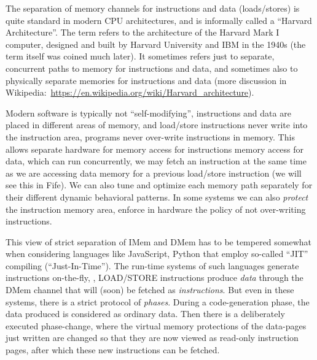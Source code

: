
The separation of memory channels for instructions and data
(loads/stores) is quite standard in modern CPU architectures, and is
informally called a ``Harvard Architecture''.  The term refers to the
architecture of the Harvard Mark I computer, designed and built by
Harvard University and IBM in the 1940s (the term itself was coined
much later).  It sometimes refers just to separate, concurrent paths
to memory for instructions and data, and sometimes also to physically
separate memories for instructions and data (more discussion in
Wikipedia:~\url{https://en.wikipedia.org/wiki/Harvard_architecture}).

Modern software is typically not ``self-modifying'', {\ie}
instructions and data are placed in different areas of memory, and
load/store instructions never write into the instruction area, {\ie}
programs never over-write instructions in memory.  This allows
separate hardware for memory access for instructions {\vs} memory
access for data, which can run concurrently, {\ie} we may fetch an
instruction at the same time as we are accessing data memory for a
previous load/store instruction (we will see this in Fife).  We can
also tune and optimize each memory path separately for their different
dynamic behavioral patterns.  In some systems we can also
\emph{protect} the instruction memory area, {\ie} enforce in hardware
the policy of not over-writing instructions.


This view of strict separation of IMem and DMem has to be tempered
somewhat when considering languages like JavaScript, Python {\etc}
that employ so-called ``JIT'' compiling (``Just-In-Time'').  The
run-time systems of such languages generate instructions on-the-fly,
{\ie}, LOAD/STORE instructions produce \emph{data} through the DMem
channel that will (soon) be fetched as \emph{instructions}.  But even
in these systems, there is a strict protocol of \emph{phases}.  During
a code-generation phase, the data produced is considered as ordinary
data.  Then there is a deliberately executed phase-change, where the
virtual memory protections of the data-pages just written are changed
so that they are now viewed as read-only instruction pages, after
which these new instructions can be fetched.


